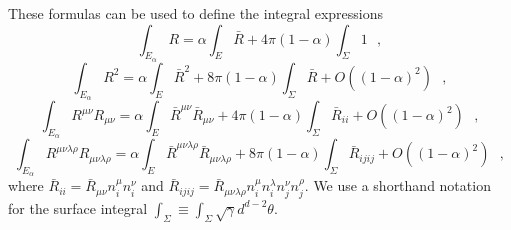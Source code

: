 \documentclass[12pt]{article}
\begin{document}
These formulas can be used to define the integral expressions  \cite{Fursaev:1995ef}
\begin{equation}
\int_{E_{\alpha}}R = \alpha\int_{E} \bar{R}
+4\pi(1-\alpha)\int_{\Sigma}1~~~,
\label{curvature integral 1}
\end{equation}
\begin{equation}
\int_{E_{\alpha}}R^2 = \alpha\int_{E} \bar{R}^2
+8\pi(1-\alpha)\int_{\Sigma}\bar{R}+O((1-\alpha)^2)~~~,
\label{curvature integral 2}
\end{equation}
\begin{equation}
\int_{E_{\alpha}}R^{\mu\nu}R_{\mu\nu} = \alpha\int_{ E}
\bar{R}^{\mu\nu}\bar{R}_{\mu\nu}
+4\pi(1-\alpha)\int_{\Sigma}\bar{R}_{ii}+O((1-\alpha)^2)~~~,
\label{curvature integral 3}
\end{equation}
\begin{equation}
\int_{E_{\alpha}}R^{\mu\nu\lambda\rho}R_{\mu\nu\lambda\rho}
=\alpha\int_{E}
\bar{R}^{\mu\nu\lambda\rho}\bar{R}_{\mu\nu\lambda\rho}
+8\pi(1-\alpha)\int_{\Sigma} \bar{R}_{ijij}
+O((1-\alpha)^2)~~~,
\label{curvature integral 4}
\end{equation}
where $\bar{R}_{ii}=\bar{R}_{\mu\nu}n_i^{\mu}n_i^{\nu}$ and
$\bar{R}_{ijij}=\bar{R}_{\mu\nu\lambda\rho}n^{\mu}_in^{\lambda}_
i
n^{\nu}_j n^{\rho}_j $. We use a shorthand notation for the  surface integral $\int_\Sigma\equiv\int_\Sigma \sqrt{\gamma}d^{d-2}\theta$.
\end{document}

